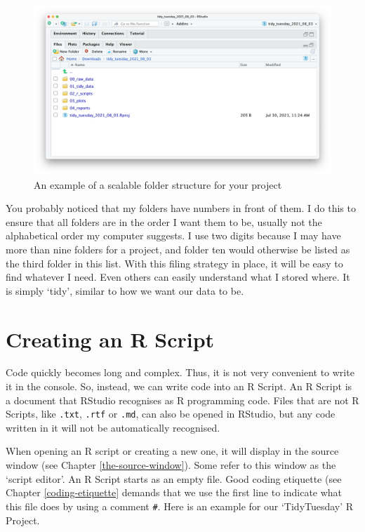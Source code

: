 \documentclass[
]{book}
\begin{document}
\begin{figure}

{\centering \includegraphics[width=38.67in]{images/chapter_06_img/01_organising_work/00_organising_work} 

}

\caption{An example of a scalable folder structure for your project}\label{fig:folder-structure}
\end{figure}

You probably noticed that my folders have numbers in front of them. I do this to ensure that all folders are in the order I want them to be, usually not the alphabetical order my computer suggests. I use two digits because I may have more than nine folders for a project, and folder ten would otherwise be listed as the third folder in this list. With this filing strategy in place, it will be easy to find whatever I need. Even others can easily understand what I stored where. It is simply `tidy', similar to how we want our data to be.

\hypertarget{creating-an-r-script}{%
\section{Creating an R Script}\label{creating-an-r-script}}

Code quickly becomes long and complex. Thus, it is not very convenient to write it in the console. So, instead, we can write code into an R Script. An R Script is a document that RStudio recognises as R programming code. Files that are not R Scripts, like \texttt{.txt}, \texttt{.rtf} or \texttt{.md}, can also be opened in RStudio, but any code written in it will not be automatically recognised.

When opening an R script or creating a new one, it will display in the source window (see Chapter \ref{the-source-window}). Some refer to this window as the `script editor'. An R Script starts as an empty file. Good coding etiquette (see Chapter \ref{coding-etiquette} demands that we use the first line to indicate what this file does by using a comment \texttt{\#}. Here is an example for our `TidyTuesday' R Project.
\end{document}
